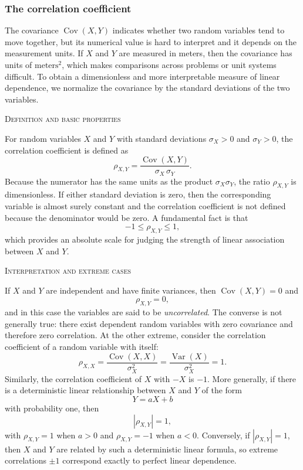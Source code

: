 \subsubsection{The correlation coefficient}

The covariance \(\operatorname{Cov}(X,Y)\) indicates whether two random variables tend to move together, but its numerical value is hard to interpret and it depends on the measurement units.  
If \(X\) and \(Y\) are measured in meters, then the covariance has units of \(\text{meters}^{2}\), which makes comparisons across problems or unit systems difficult.  
To obtain a dimensionless and more interpretable measure of linear dependence, we normalize the covariance by the standard deviations of the two variables.

\bigskip
\textsc{Definition and basic properties}

For random variables \(X\) and \(Y\) with standard deviations \(\sigma_X>0\) and \(\sigma_Y>0\), the correlation coefficient is defined as
\[
\rho_{X,Y}
=
\frac{\operatorname{Cov}(X,Y)}{\sigma_X\,\sigma_Y}.
\]
Because the numerator has the same units as the product \(\sigma_X\sigma_Y\), the ratio \(\rho_{X,Y}\) is dimensionless.  
If either standard deviation is zero, then the corresponding variable is almost surely constant and the correlation coefficient is not defined because the denominator would be zero.  
A fundamental fact is that
\[
-1 \le \rho_{X,Y} \le 1,
\]
which provides an absolute scale for judging the strength of linear association between \(X\) and \(Y\).

\bigskip
\textsc{Interpretation and extreme cases}

If \(X\) and \(Y\) are independent and have finite variances, then \(\operatorname{Cov}(X,Y)=0\) and
\[
\rho_{X,Y}=0,
\]
and in this case the variables are said to be \textit{uncorrelated}.  
The converse is not generally true: there exist dependent random variables with zero covariance and therefore zero correlation.  
At the other extreme, consider the correlation coefficient of a random variable with itself:
\[
\rho_{X,X}
=
\frac{\operatorname{Cov}(X,X)}{\sigma_X^{2}}
=
\frac{\operatorname{Var}(X)}{\sigma_X^{2}}
=
1.
\]
Similarly, the correlation coefficient of \(X\) with \(-X\) is \(-1\).  
More generally, if there is a deterministic linear relationship between \(X\) and \(Y\) of the form
\[
Y = aX + b
\]
with probability one, then
\[
|\rho_{X,Y}| = 1,
\]
with \(\rho_{X,Y}=1\) when \(a>0\) and \(\rho_{X,Y}=-1\) when \(a<0\).  
Conversely, if \(|\rho_{X,Y}|=1\), then \(X\) and \(Y\) are related by such a deterministic linear formula, so extreme correlations \(\pm1\) correspond exactly to perfect linear dependence.

